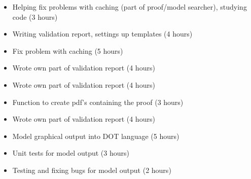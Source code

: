 %
{ \begin{itemize} 
  \item Helping fix problems with caching (part of proof/model searcher), studying code (3 hours)
 \item  Writing validation report, settings up templates (4 hours)
 \end{itemize} 
}%
{ \begin{itemize} 
 \item Fix problem with caching (5 hours)
 \item Wrote own part of validation report (4 hours)
 \end{itemize} 
}%
{ \begin{itemize} 
 \item Wrote own part of validation report (4 hours)
 \item Function to create pdf's containing the proof (3 hours)
 \end{itemize} 
}%
{ \begin{itemize} 
  \item Wrote own part of validation report (4 hours)
 \item Model graphical output into DOT language (5 hours)
 \item Unit tests for model output (3 hours)
 \item Testing and fixing bugs for model output (2 hours)
 \end{itemize} 
}%